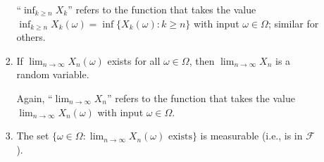 \begin{enumerate}
\begin{enumerate}
\begin{enumerate}
\begin{note}
``\(\inf_{k\ge n}X_k\)'' refers to the function that takes the value
\(\inf_{k\ge n}X_k(\omega)=\inf\{X_k(\omega):k\ge n\}\) with input
\(\omega\in\Omega\); similar for others.
\end{note}
\item If \(\lim_{n\to\infty}X_n(\omega)\) exists for all \(\omega\in\Omega\),
then \(\lim_{n\to\infty}X_n\) is a random variable.

\begin{note}
Again, ``\(\lim_{n\to\infty}X_n\)'' refers to the function that takes the value
\(\lim_{n\to\infty}X_n(\omega)\) with input \(\omega\in\Omega\).
\end{note}
\item The set \(\{\omega\in\Omega:\lim_{n\to\infty}X_n(\omega)\text{ exists}\}\) is measurable 
(i.e., is in \(\mathcal{F}\)).
\end{enumerate}


\end{enumerate}
\end{enumerate}
